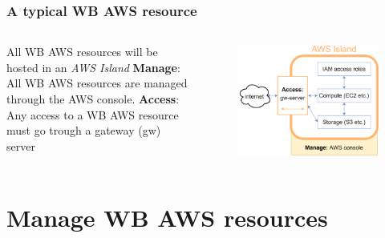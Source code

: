 \documentclass[aspectratio=169]{beamer} %
\begin{document}
\begin{frame}
\frametitle{A typical WB AWS resource}

	\begin{columns}[c]
		\large All WB AWS resources will be hosted in an \textit{AWS Island}
		\vspace{.7cm}\newline
		\large \textbf{Manage}: All WB AWS resources are managed through the AWS console.
		\vspace{.7cm}\newline
		\large \textbf{Access}: Any access to a WB AWS resource must go trough a gateway (gw) server
		
		\begin{figure}
			\centering
			\includegraphics[width=\textwidth]{./img/wb-aws.png}
		\end{figure}

	\end{columns}
\end{frame}



\section{Manage WB AWS resources}
\end{document}
